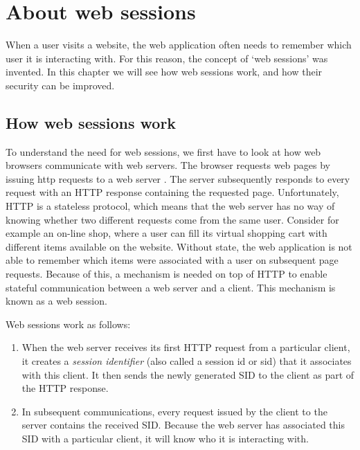 \chapter{About web sessions}

When a user visits a website, the web application often needs to remember which user it is interacting with. For this reason, the concept of `web sessions' was invented. In this chapter we will see how web sessions work, and how their security can be improved.

\section{How web sessions work}\label{session-management}

To understand the need for web sessions, we first have to look at how web browsers communicate with web servers. The browser requests web pages by issuing \gls{http} requests to a web server \cite{Kurose2008}. The server subsequently responds to every request with an HTTP response containing the requested page. Unfortunately, HTTP is a stateless protocol, which means that the web server has no way of knowing whether two different requests come from the same user. Consider for example an on-line shop, where a user can fill its virtual shopping cart with different items available on the website. Without state, the web application is not able to remember which items were associated with a user on subsequent page requests. Because of this, a mechanism is needed on top of HTTP to enable stateful communication between a web server and a client. This mechanism is known as a web session.

Web sessions work as follows:
\begin{enumerate}
	\item When the web server receives its first HTTP request from a particular client, it creates a \emph{session identifier} (also called a \gls{session id} or \gls{sid}) that it associates with this client. It then sends the newly generated SID to the client as part of the HTTP response.
	\item In subsequent communications, every request issued by the client to the server contains the received SID. Because the web server has associated this SID with a particular client, it will know who it is interacting with.
\end{enumerate}

